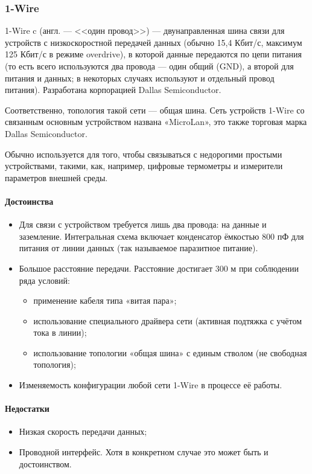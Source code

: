 \documentclass[a4paper,14pt]{extarticle}
\begin{document}
\begin{problem}
	
	
	\subsubsection*{1-Wire}
	1-Wire c (англ. --- <<один провод>>) --- двунаправленная шина связи для устройств с низкоскоростной передачей данных (обычно 15,4 Кбит/с, максимум 125 Кбит/с в режиме overdrive), в которой данные передаются по цепи питания (то есть всего используются два провода — один общий (GND), а второй для питания и данных; в некоторых случаях используют и отдельный провод питания). Разработана корпорацией Dallas Semiconductor.
	
	Соответственно, топология такой сети --- общая шина. Сеть устройств 1-Wire со связанным основным устройством названа «MicroLan», это также торговая марка Dallas Semiconductor.
	
	Обычно используется для того, чтобы связываться с недорогими простыми устройствами, такими, как, например, цифровые термометры и измерители параметров внешней среды.
	
	\paragraph*{Достоинства}
	
	\begin{itemize}
		\item Для связи с устройством требуется лишь два провода: на данные и заземление. Интегральная схема включает конденсатор ёмкостью 800 пФ для питания от линии данных (так называемое паразитное питание).
		\item Большое расстояние передачи. Расстояние достигает 300 м при соблюдении ряда условий:
		\begin{itemize}
			\item применение кабеля типа «витая пара»;
			\item использование специального драйвера сети (активная подтяжка с учётом тока в линии);
			\item использование топологии «общая шина» с единым стволом (не свободная топология);
		\end{itemize}
		
		\item Изменяемость конфигурации любой сети 1-Wire в процессе её работы.
	\end{itemize}
	
	\paragraph*{Недостатки}
	\begin{itemize}
		\item Низкая скорость передачи данных;
		\item Проводной интерфейс. Хотя в конкретном случае это может быть и достоинством.
	\end{itemize}
	

\end{problem}
\end{document}
